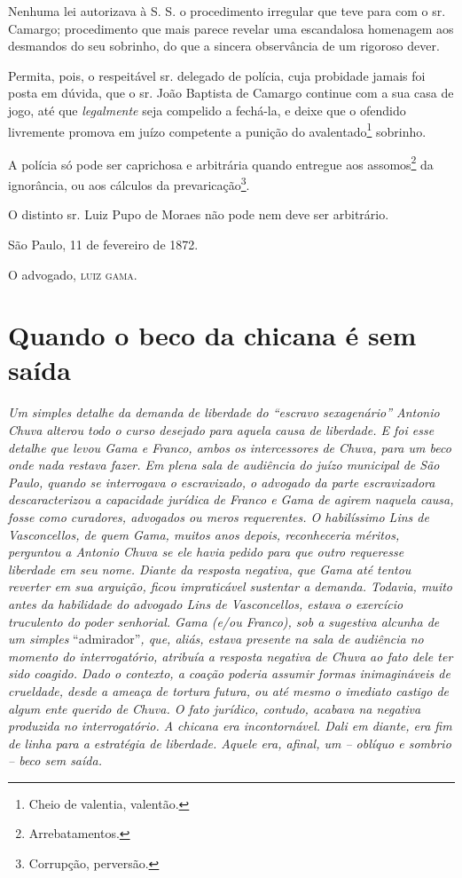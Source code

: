 {\begin{flushright}
Nenhuma lei autorizava à S. S. o procedimento irregular que teve para
com o sr. Camargo; procedimento que mais parece revelar uma escandalosa
homenagem aos desmandos do seu sobrinho, do que a sincera observância de
um rigoroso dever.

Permita, pois, o respeitável sr. delegado de polícia, cuja probidade
jamais foi posta em dúvida, que o sr. João Baptista de Camargo continue
com a sua casa de jogo, até que \emph{legalmente} seja compelido a
fechá-la, e deixe que o ofendido livremente promova em juízo competente
a punição do avalentado\footnote{ Cheio de valentia, valentão.}
sobrinho.

A polícia só pode ser caprichosa e arbitrária quando entregue aos
assomos\footnote{ Arrebatamentos.} da ignorância, ou aos cálculos da
prevaricação\footnote{ Corrupção, perversão.}.

O distinto sr. Luiz Pupo de Moraes não pode nem deve ser arbitrário.

São Paulo, 11 de fevereiro de 1872.

O advogado, \textsc{luiz gama}.

\part{Quando o beco da chicana é sem saída}

\begin{argumento}
\emph{Um simples detalhe da demanda de liberdade do ``escravo
sexagenário'' Antonio Chuva alterou todo o curso desejado para aquela
causa de liberdade. E foi esse detalhe que levou Gama e Franco, ambos os
intercessores de Chuva, para um beco onde nada restava fazer. Em plena
sala de audiência do juízo municipal de São Paulo, quando se interrogava
o escravizado, o advogado da parte escravizadora descaracterizou a
capacidade jurídica de Franco e Gama de agirem naquela causa, fosse como
curadores, advogados ou meros requerentes. O habilíssimo Lins de
Vasconcellos, de quem Gama, muitos anos depois, reconheceria méritos,
perguntou a Antonio Chuva se ele havia pedido para que outro requeresse
liberdade em seu nome. Diante da resposta negativa, que Gama até tentou
reverter em sua arguição, ficou impraticável sustentar a demanda.
Todavia, muito antes da habilidade do advogado Lins de Vasconcellos,
estava o exercício truculento do poder senhorial. Gama (e/ou Franco),
sob a sugestiva alcunha de um simples} ``admirador''\emph{, que, aliás,
estava presente na sala de audiência no momento do interrogatório,
atribuía a resposta negativa de Chuva ao fato dele ter sido coagido.
Dado o contexto, a coação poderia assumir formas inimagináveis de
crueldade, desde a ameaça de tortura futura, ou até mesmo o imediato
castigo de algum ente querido de Chuva. O fato jurídico, contudo,
acabava na negativa produzida no interrogatório. A chicana era
incontornável. Dali em diante, era fim de linha para a estratégia de
liberdade. Aquele era, afinal, um -- oblíquo e sombrio -- beco sem
saída.}
\end{argumento}


\end{flushright}}
